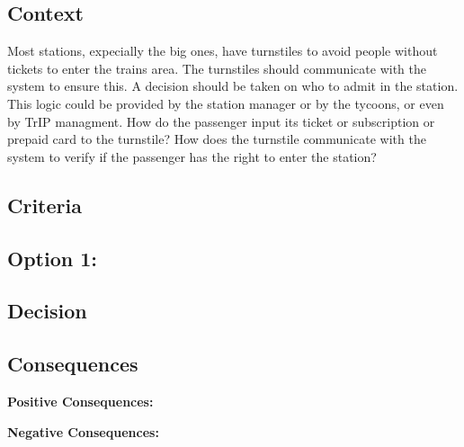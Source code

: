 \subsection*{Context}

Most stations, expecially the big ones, have turnstiles to avoid people without tickets to enter the trains area.
The turnstiles should communicate with the system to ensure this. A decision should be taken on who to admit in the station.
This logic could be provided by the station manager or by the tycoons, or even by TrIP managment.
How do the passenger input its ticket or subscription or prepaid card to the turnstile?
How does the turnstile communicate with the system to verify if the passenger has the right to enter the station?

\subsection*{Criteria}
\begin{itemize}
\end{itemize}

\subsection*{Option 1: }

\subsection*{Decision}

\subsection*{Consequences}
\textbf{Positive Consequences:}
\begin{itemize}
\end{itemize}
\textbf{Negative Consequences:}
\begin{itemize}
\end{itemize}